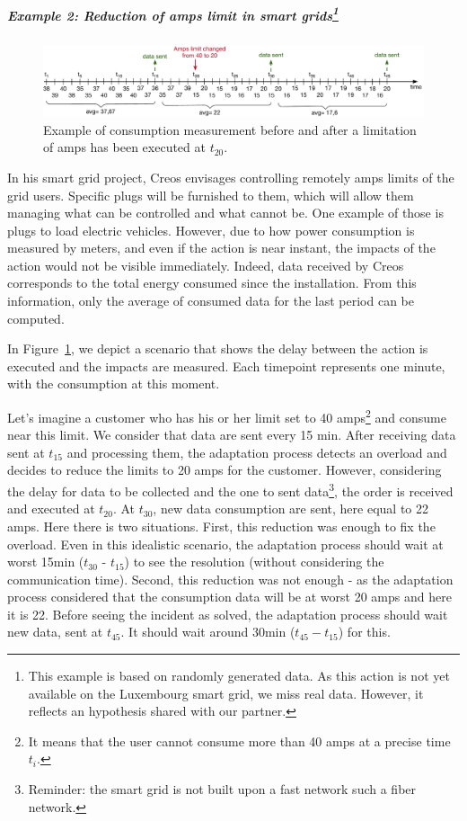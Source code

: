\subparagraph[Example 2: Reduction of amps limits in smart grids]{Example 2: Reduction of amps limit in smart grids\footnote{This example is based on randomly generated data. As this action is not yet available on the Luxembourg smart grid, we miss real data. However, it reflects an hypothesis shared with our partner.}}
\begin{figure}
	\centering
	\includegraphics[width=\linewidth]{img/chapt-tkm/intro/long-action-amps-limit}
	\caption{Example of consumption measurement before and after a limitation of amps has been executed at $t_{20}$.}
	\label{fig:tkm:intro:example-long-action-amps-limit}
\end{figure}

In his smart grid project, Creos envisages controlling remotely amps limits of the grid users.
Specific plugs will be furnished to them, which will allow them managing what can be controlled and what cannot be.
One example of those is plugs to load electric vehicles.
However, due to how power consumption is measured by meters, and even if the action is near instant, the impacts of the action would not be visible immediately.
Indeed, data received by Creos corresponds to the total energy consumed since the installation.
From this information, only the average of consumed data for the last period can be computed.

In Figure~\ref{fig:tkm:intro:example-long-action-amps-limit}, we depict a scenario that shows the delay between the action is executed and the impacts are measured.
Each timepoint represents one minute, with the consumption at this moment.

Let's imagine a customer who has his or her limit set to 40 amps\footnote{It means that the user cannot consume more than 40 amps at a precise time $t_i$.} and consume near this limit.
We consider that data are sent every 15 min.
After receiving data sent at $t_{15}$ and processing them, the adaptation process detects an overload and decides to reduce the limits to 20 amps for the customer.
However, considering the delay for data to be collected and the one to sent data\footnote{Reminder: the smart grid is not built upon a fast network such a fiber network.}, the order is received and executed at $t_{20}$.
At $t_30$, new data consumption are sent, here equal to 22 amps.
Here there is two situations.
First, this reduction was enough to fix the overload.
Even in this idealistic scenario, the adaptation process should wait at worst 15min ($t_{30}$ - $t_{15}$) to see the resolution (without considering the communication time).
Second, this reduction was not enough - as the adaptation process considered that the consumption data will be at worst 20 amps and here it is 22.
Before seeing the incident as solved, the adaptation process should wait new data, sent at $t_{45}$.
It should wait around 30min ($t_{45} - t_{15}$) for this.


